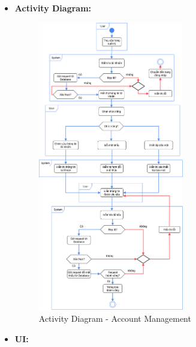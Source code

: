 \documentclass[a4paper]{article}
\begin{document}
\begin{itemize}
	\item \textbf{Activity Diagram:}
	      \begin{figure}[H]
		      \centering
		      \includegraphics[width=0.6\textwidth]{Images/account-management_activity.png}
		      \caption{Activity Diagram - Account Management}
	      \end{figure}
	\item \textbf{UI:}


\end{itemize}
\end{document}
